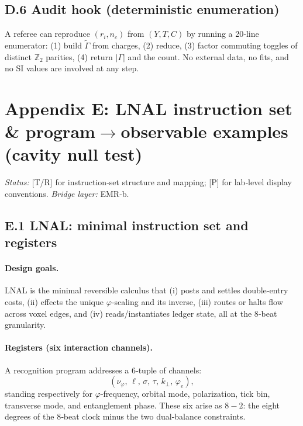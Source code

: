 \documentclass[11pt]{article}
\begin{document}
\begin{proposition}
\subsection*{D.6  Audit hook (deterministic enumeration)}
A referee can reproduce \((r_i,n_c)\) from \((Y,T,C)\) by running a 20‑line enumerator:
(1) build \(\widetilde\Gamma\) from charges, (2) reduce, (3) factor commuting toggles of distinct \(\mathbb Z_2\) parities, (4) return \(|\Gamma|\) and the count. No external data, no fits, and no SI values are involved at any step.%

\section*{Appendix E: LNAL instruction set \& program$\to$observable examples (cavity null test)}
\noindent\emph{Status:} [T/R] for instruction‑set structure and mapping; [P] for lab‑level display conventions. \emph{Bridge layer:} EMR‑b.

\subsection*{E.1  LNAL: minimal instruction set and registers}

\paragraph{Design goals.}
LNAL is the minimal reversible calculus that (i) posts and settles double‑entry costs, (ii) effects the unique $\varphi$‑scaling and its inverse, (iii) routes or halts flow across voxel edges, and (iv) reads/instantiates ledger state, all at the 8‑beat granularity.

\paragraph{Registers (six interaction channels).}
A recognition program addresses a 6‑tuple of channels:
\[
(\nu_{\varphi},\,\ell,\,\sigma,\,\tau,\,k_{\perp},\,\varphi_{e}),
\]
standing respectively for $\varphi$‑frequency, orbital mode, polarization, tick bin, transverse mode, and entanglement phase. These six arise as $8-2$: the eight degrees of the 8‑beat clock minus the two dual‑balance constraints.


\end{proposition}
\end{document}
